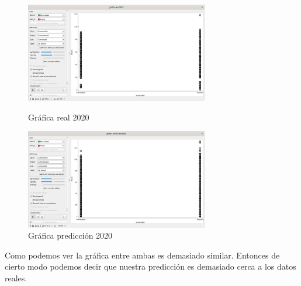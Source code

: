 \begin{figure}[htb!]
\begin{minipage}[b]{0.5\linewidth} %
\centering
\includegraphics[width=8cm]{imagenes/grafica-real-2020.png}
    \caption{Gráfica real 2020}
    \label{graficareal}
\end{minipage}
\hspace{0.5cm} %
\begin{minipage}[b]{0.5\linewidth}
\centering
\includegraphics[width=8cm]{imagenes/grafica-prediccion.png}
    \caption{Gráfica predicción 2020}
    \label{graficaprediccion}
\end{minipage}
\end{figure}
\newpage
Como podemos ver la gráfica entre ambas es demasiado similar.
Entonces de cierto modo podemos decir que nuestra predicción es demasiado cerca a los datos reales.